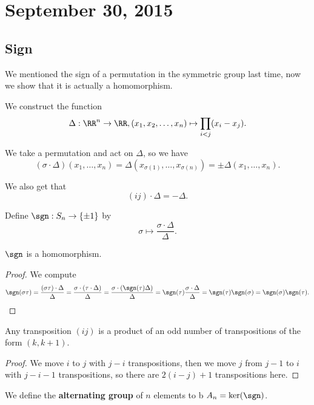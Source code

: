 \section{September 30, 2015}

\subsection{Sign}

We mentioned the sign of a permutation in the symmetric group last time,
now we show that it is actually a homomorphism.

We construct the function
\[ \Delta : \RR^n \to \RR, (x_1, x_2, \dots, x_n) \mapsto \prod_{i < j}
(x_i - x_j). \]

We take a permutation and act on $\Delta$, so we have
\[ (\sigma \cdot \Delta)(x_1, \dots, x_n) = \Delta(x_{\sigma(1)}, \dots,
x_{\sigma(n)}) = \pm \Delta(x_1, \dots, x_n). \]

We also get that
\[ (ij) \cdot \Delta = -\Delta. \]

\begin{df}
Define $\sgn : S_n \to \lbrace \pm 1 \rbrace$ by
\[ \sigma \mapsto \frac{\sigma \cdot \Delta}{\Delta}. \]
\end{df}

\begin{prop}
$\sgn$ is a homomorphism.
\end{prop}

\begin{proof}
We compute
\[ \sgn(\sigma \tau) = \frac{(\sigma \tau) \cdot \Delta}{\Delta} =
\frac{\sigma \cdot (\tau \cdot \Delta)}{\Delta} = \frac{\sigma \cdot
(\sgn(\tau) \Delta)}{\Delta} =  \sgn(\tau)\frac{\sigma \cdot
\Delta}{\Delta} = \sgn(\tau) \sgn(\sigma) = \sgn(\sigma) \sgn(\tau). \]
\end{proof}

\begin{prop}
Any transposition $(ij)$ is a product of an odd number of transpositions
of the form $(k, k + 1)$.
\end{prop}

\begin{proof}
We move $i$ to $j$ with $j - i$ transpositions, then we move $j$ from $j
- 1$ to $i$ with $j - i - 1$ transpositions, so there are $2(i - j) + 1$
transpositions here.
\end{proof}

\begin{df}
We define the \textbf{alternating group} of $n$ elements to b $A_n =
\ker(\sgn)$.
\end{df}

